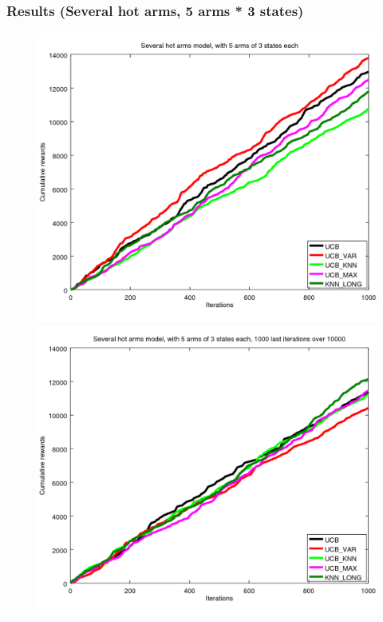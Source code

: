 \documentclass[french]{beamer}
\begin{document}
\begin{frame}
	\frametitle{Results (Several hot arms, 5 arms * 3 states)}
	
	\begin{figure}[h]
		\begin{minipage}[b]{.49\linewidth}
			\includegraphics[width=1.0\textwidth]{begin_ms_1000it.png}
			
		\end{minipage}
		\hfill
		\begin{minipage}[b]{0.49\linewidth}
			\includegraphics[width=1.0\textwidth]{last_ms_1000it.png}
			
		\end{minipage}
		\label{fig:f}
	\end{figure}
	
\end{frame}
\end{document}

